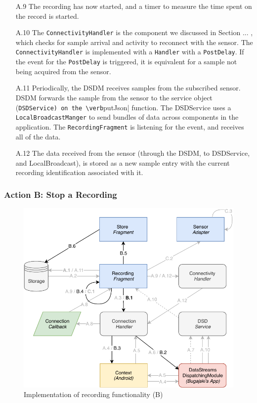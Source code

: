 \begin{itemize}
	\item[A.9] The recording has now started, and a timer to measure the time spent on the record is started. 
	\item[A.10] The \verb|ConnectivityHandler| is the component we discussed in Section ... , which checks for sample arrival and activity to reconnect with the sensor. The \verb|ConnectivityHandler| is implemented with a \verb|Handler| with a \verb|PostDelay|. If the event for the \verb|PostDelay| is triggered, it is equivalent for a sample not being acquired from the sensor. 
	\item[A.11] Periodically, the DSDM receives samples from the subscribed sensor. DSDM forwards the sample from the sensor to the service object (\verb|DSDService) on the \verb|putJson| function. The DSDService uses a \verb|LocalBroadcastManger| to send bundles of data across components in the application. The \verb|RecordingFragment| is listening for the event, and receives all of the data. 
	\item[A.12] The data received from the sensor (through the DSDM, to DSDService, and LocalBroadcast), is stored as a new sample entry with the current recording identification associated with it. 
\end{itemize}

\subsubsection{Action B: Stop a Recording}
\begin{figure}
    \centering
    \includegraphics[scale=0.7]{images/Recording_ImpB.pdf}
    \caption{Implementation of recording functionality (B)}
    \label{fig:impl_recordingB}
\end{figure}

